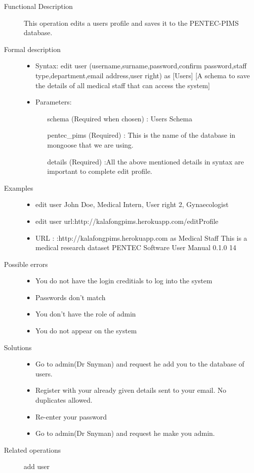 \documentclass[a4paper]{article}
\begin{document}
\begin{description}
\item[Functional Description] This operation edits a users profile and saves it to the PENTEC-PIMS database.
\item[Formal description]\hfill
\begin{itemize}
	\item Syntax: edit user (username,surname,password,confirm password,staff type,department,email address,user right) as [Users] [A schema to save the details of all medical staff that can access the system]\\
	\item Parameters:
		\begin{itemize}
			\item [schema] (Required when chosen) : Users Schema
			\item [pentec\_pims] (Required) : This is the name of the database in mongoose that we are using.
			\item [details] (Required) :All the above mentioned details in syntax are important to complete edit profile.
		\end{itemize}
\end{itemize}

\item[Examples]\hfill
\begin{itemize}
	\item edit user John Doe, Medical Intern, User right 2, Gynaecologist
	\item edit user url:http://kalafongpims.herokuapp.com/editProfile
	\item URL : :http://kalafongpims.herokuapp.com as Medical Staff This is a medical research dataset PENTEC Software User Manual 0.1.0 14
\end{itemize}

\item[Possible errors]\hfill
\begin{itemize}
	\item You do not have the login creditials to log into the system
	\item Passwords don't match
	\item You don't have the role of admin
	\item You do not appear on the system
\end{itemize}

\item[Solutions]\hfill
\begin{itemize}
	\item Go to admin(Dr Snyman) and request he add you to the database of users.
	\item Register with your already given details sent to your email. No duplicates allowed.
	\item Re-enter your password
	\item  Go to admin(Dr Snyman) and request he make you admin.
\end{itemize}
\item[Related operations] add user
\end{description}
		   
\end{document}
